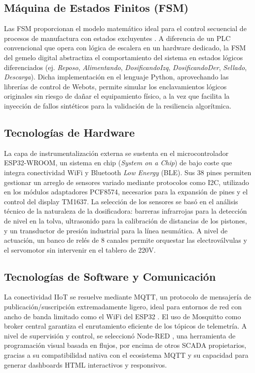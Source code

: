 \subsection*{Máquina de Estados Finitos (FSM)}
Las FSM proporcionan el modelo matemático ideal para el control secuencial de procesos de manufactura con estados excluyentes \cite{cassandras2021}. A diferencia de un PLC convencional que opera con lógica de escalera en un hardware dedicado, la FSM del gemelo digital abstractiza el comportamiento del sistema en estados lógicos diferenciados (ej. \textit{Reposo}, \textit{Alimentando}, \textit{DosificandoIzq}, \textit{DosificandoDer}, \textit{Sellado}, \textit{Descarga}). Dicha implementación en el lenguaje Python, aprovechando las librerías de control de Webots, permite simular los enclavamientos lógicos originales sin riesgo de dañar el equipamiento físico, a la vez que facilita la inyección de fallos sintéticos para la validación de la resiliencia algorítmica.

\subsection*{Tecnologías de Hardware}
La capa de instrumentalización externa se sustenta en el microcontrolador ESP32-WROOM, un sistema en chip (\textit{System on a Chip}) de bajo coste que integra conectividad WiFi y Bluetooth \textit{Low Energy} (BLE). Sus 38 pines permiten gestionar un arreglo de sensores variado mediante protocolos como I2C, utilizado en los módulos adaptadores PCF8574, necesarios para la expansión de pines y el control del display TM1637. La selección de los sensores se basó en el análisis técnico de la naturaleza de la dosificadora: barreras infrarrojas para la detección de nivel en la tolva, ultrasonido para la calibración de distancias de los pistones, y un transductor de presión industrial para la línea neumática. A nivel de actuación, un banco de relés de 8 canales permite orquestar las electroválvulas y el servomotor sin intervenir en el tablero de 220V.

\subsection*{Tecnologías de Software y Comunicación}
La conectividad IIoT se resuelve mediante MQTT, un protocolo de mensajería de publicación/suscripción extremadamente ligero, ideal para entornos de red con ancho de banda limitado como el WiFi del ESP32 \cite{hunkeler2008}. El uso de Mosquitto como broker central \cite{light2017} garantiza el enrutamiento eficiente de los tópicos de telemetría. A nivel de supervisión y control, se seleccionó Node-RED \cite{blackstock2014}, una herramienta de programación visual basada en flujos, por encima de otros SCADA propietarios, gracias a su compatibilidad nativa con el ecosistema MQTT y su capacidad para generar dashboards HTML interactivos y responsivos.

